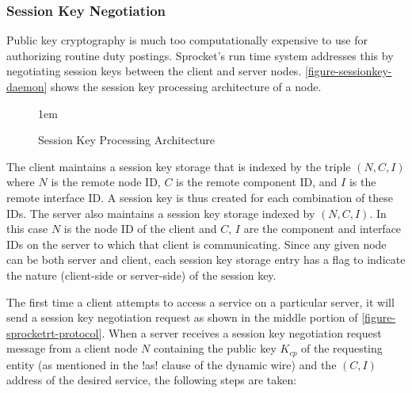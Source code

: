 \subsubsection{Session Key Negotiation}

Public key cryptography is much too computationally expensive to use for authorizing routine
duty postings. Sprocket's run time system addresses this by negotiating session keys between the
client and server nodes. \autoref{figure-sessionkey-daemon} shows the session key processing
architecture of a node.

\begin{figure}[htbp]
  
  \centerline{\raise 1em\box\graph}
  \caption{Session Key Processing Architecture}
  \label{figure-sessionkey-daemon}
\end{figure}

The client maintains a session key storage that is indexed by the triple $(N, C, I)$ where $N$
is the remote node ID, $C$ is the remote component ID, and $I$ is the remote interface ID. A
session key is thus created for each combination of these IDs. The server also maintains a
session key storage indexed by $(N, C, I)$. In this case $N$ is the node ID of the client and
$C$, $I$ are the component and interface IDs on the server to which that client is
communicating. Since any given node can be both server and client, each session key storage
entry has a flag to indicate the nature (client-side or server-side) of the session key.

%

The first time a client attempts to access a service on a particular server, it will send a
session key negotiation request as shown in the middle portion of
\autoref{figure-sprocketrt-protocol}. When a server receives a session key negotiation request
message from a client node $N$ containing the public key $K_{cp}$ of the requesting entity (as
mentioned in the !as! clause of the dynamic wire) and the $(C, I)$ address of the desired
service, the following steps are taken:

